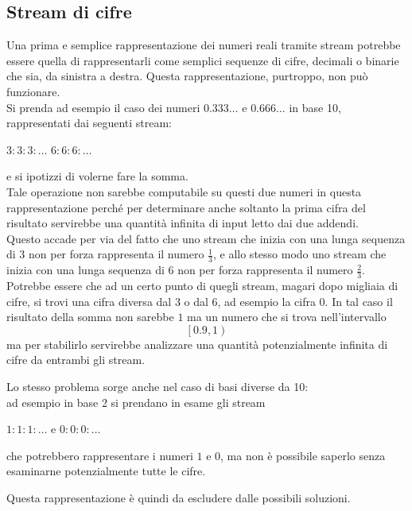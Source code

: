 \documentclass[Lau]{sapthesis}
\begin{document}
\subsection{Stream di cifre}
Una prima e semplice rappresentazione dei numeri reali tramite stream potrebbe 
essere quella di rappresentarli come semplici sequenze di cifre, decimali o 
binarie che sia, da sinistra a destra. Questa rappresentazione, purtroppo, non 
può funzionare.\\
Si prenda ad esempio il caso dei numeri $0.333\ldots$ e $0.666\ldots$ in 
base 10, rappresentati dai seguenti stream:
\begin{center}
$3:3:3:\ldots$ \hspace{1cm} $6:6:6:\ldots$
\end{center}
e si ipotizzi di volerne fare la somma.\\
Tale operazione non sarebbe computabile su questi due numeri in questa 
rappresentazione perché per determinare anche soltanto la prima cifra del 
risultato servirebbe una quantità infinita di input letto dai due addendi.\\
Questo accade per via del fatto che uno stream che inizia con una lunga sequenza 
di 3 non per forza rappresenta il numero $\frac{1}{3}$, e allo stesso modo uno 
stream che inizia con una lunga sequenza di 6 non per forza rappresenta il 
numero $\frac{2}{3}$. Potrebbe essere che 
ad un certo punto di quegli stream, magari dopo migliaia di cifre, si trovi una 
cifra diversa dal 3 o dal 6, ad esempio la cifra 0. In tal caso il risultato 
della somma 
non sarebbe $1$ ma un numero che si trova nell'intervallo
$$\left[0.9,1\right)$$
ma per stabilirlo servirebbe analizzare una quantità potenzialmente infinita di 
cifre da entrambi gli stream.

\medskip

Lo stesso problema sorge anche nel caso di basi diverse da 10:\\
ad esempio in base 2 si prendano in esame gli stream
\begin{center}
$1:1:1:\ldots$ \hspace{0.5cm} e \hspace{0.5cm} $0:0:0:\ldots$
\end{center}
che potrebbero rappresentare i numeri $1$ e $0$, ma non è possibile saperlo 
senza esaminarne potenzialmente tutte le cifre.

\medskip

Questa rappresentazione è quindi da escludere dalle possibili soluzioni.
\end{document}
